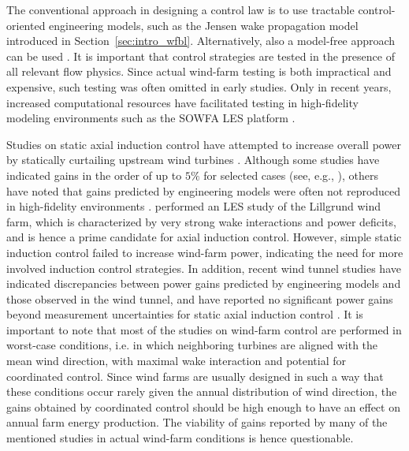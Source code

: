 The conventional approach in designing a control law is to use tractable control-oriented engineering models, such as the Jensen wake propagation model \citep{jensen1983note, katic1986simple} introduced in Section~\ref{sec:intro_wfbl}. Alternatively, also a model-free approach can be used \citep{marden2013model, gebraad2015maximum, ciri2017model}. It is important that control strategies are tested in the presence of all relevant flow physics. Since actual wind-farm testing is both impractical and expensive, such testing was often omitted in early studies. Only in recent years, increased computational resources have facilitated testing in high-fidelity modeling environments such as the SOWFA LES platform \citep{churchfield2012large, fleming2013sowfa}. 

Studies on static axial induction control have attempted to increase overall power by statically curtailing upstream wind turbines \citep{knudsen2015survey}. Although some studies have indicated gains in the order of up to $5\%$ for selected cases (see, e.g., \citealp{horvat2012quasi, johnson2012assessment, gebraad2015maximum}), others have noted that gains predicted by engineering models were often not reproduced in high-fidelity environments \citep{annoni2016analysis}. \cite{nilsson2015large} performed an LES study of the Lillgrund wind farm, which is characterized by very strong wake interactions and power deficits, and is hence a prime candidate for axial induction control. However, simple static induction control failed to increase wind-farm power, indicating the need for more involved induction control strategies. In addition, recent wind tunnel studies have indicated discrepancies between power gains predicted by engineering models and those observed in the wind tunnel, and have reported no significant power gains beyond measurement uncertainties for static axial induction control  \citep{campagnolo2016wind, bartl2016experimental}. It is important to note that most of the studies on wind-farm control are performed in worst-case conditions, i.e. in which neighboring turbines are aligned with the mean wind direction, with maximal wake interaction and potential for coordinated control. Since wind farms are usually designed in such a way that these conditions occur rarely given the annual distribution of wind direction, the gains obtained by coordinated control should be high enough to have an effect on annual farm energy production. The viability of gains reported by many of the mentioned studies in actual wind-farm conditions is hence questionable.  

